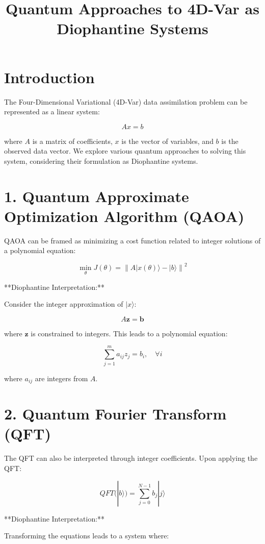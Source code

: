 \documentclass{article}
\title{Quantum Approaches to 4D-Var as Diophantine Systems}
\author{}
\date{}
\begin{document}
\maketitle

\section{Introduction}

The Four-Dimensional Variational (4D-Var) data assimilation problem can be represented as a linear system:

\[
Ax = b
\]

where \( A \) is a matrix of coefficients, \( x \) is the vector of variables, and \( b \) is the observed data vector. We explore various quantum approaches to solving this system, considering their formulation as Diophantine systems.

\section{1. Quantum Approximate Optimization Algorithm (QAOA)}

QAOA can be framed as minimizing a cost function related to integer solutions of a polynomial equation:

\[
\min_{\theta} J(\theta) = \left\| A |x(\theta)\rangle - |b\rangle \right\|^2
\]

**Diophantine Interpretation:**

Consider the integer approximation of \( |x\rangle \):

\[
A \mathbf{z} = \mathbf{b}
\]

where \( \mathbf{z} \) is constrained to integers. This leads to a polynomial equation:

\[
\sum_{j=1}^m a_{ij} z_j = b_i, \quad \forall i
\]

where \( a_{ij} \) are integers from \( A \).

\section{2. Quantum Fourier Transform (QFT)}

The QFT can also be interpreted through integer coefficients. Upon applying the QFT:

\[
QFT(|b\rangle) = \sum_{j=0}^{N-1} b_j |j\rangle
\]

**Diophantine Interpretation:**

Transforming the equations leads to a system where:
\end{document}
